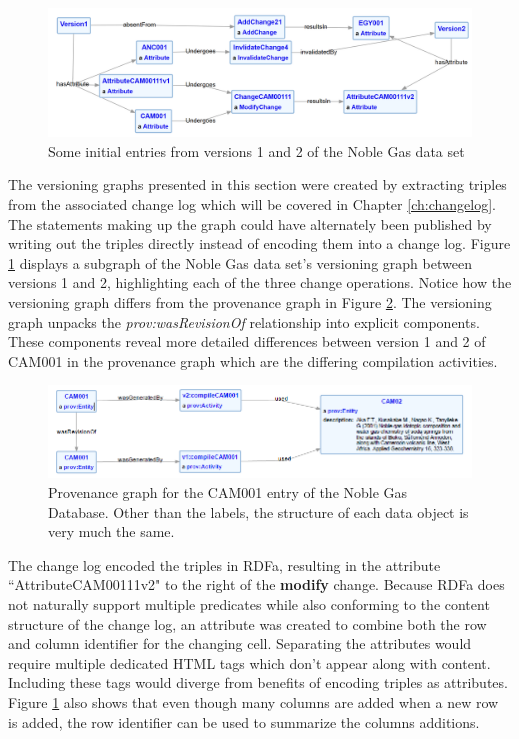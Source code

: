 \begin{figure}
	\centering
	\includegraphics[scale=0.25]{figures/NobleVersion.png}
	\caption{Some initial entries from versions 1 and 2 of the Noble Gas data set}
	\label{NobleGraph1}
\end{figure}
The versioning graphs presented in this section were created by extracting triples from the associated change log which will be covered in Chapter \ref{ch:changelog}.
The statements making up the graph could have alternately been published by writing out the triples directly instead of encoding them into a change log.
Figure \ref{NobleGraph1} displays a subgraph of the Noble Gas data set's versioning graph between versions 1 and 2, highlighting each of the three change operations.
Notice how the versioning graph differs from the provenance graph in Figure \ref{CAM001ProvGraph}.
The versioning graph unpacks the \textit{prov:wasRevisionOf} relationship into explicit components.
These components reveal more detailed differences between version 1 and 2 of CAM001 in the provenance graph which are the differing compilation activities.
\begin{figure}[b]
	\centering
	\includegraphics[scale=0.65]{figures/CAM001v1v2.png}
	\caption{Provenance graph for the CAM001 entry of the Noble Gas Database.  Other than the labels, the structure of each data object is very much the same.}
	\label{CAM001ProvGraph}
\end{figure}
The change log encoded the triples in RDFa, resulting in the attribute ``AttributeCAM00111v2" to the right of the \textbf{modify} change.
Because RDFa does not naturally support multiple predicates while also conforming to the content structure of the change log, an attribute was created to combine both the row and column identifier for the changing cell.
Separating the attributes would require multiple dedicated HTML tags which don't appear along with content.
Including these tags would diverge from benefits of encoding triples as attributes.
Figure \ref{NobleGraph1} also shows that even though many columns are added when a new row is added, the row identifier can be used to summarize the columns additions.

